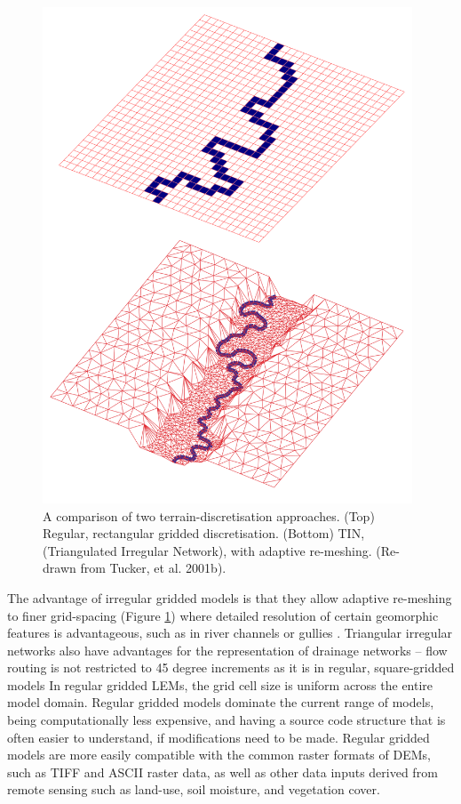 \begin{figure}[t]
\includegraphics[width=11cm]{LEMFinalRevisedmanuscriptDAVFinalrevisions-img/LEMFinalRevisedmanuscriptDAVFinalrevisions-img005.png} 
\caption{A comparison of two terrain-discretisation approaches. (Top) Regular, rectangular gridded discretisation. (Bottom) TIN, (Triangulated Irregular Network), with adaptive re-meshing. (Re-drawn from Tucker, et al. 2001b).}
\label{fig_LEM_discretisation}
\end{figure}

The advantage of irregular gridded models is that they allow adaptive re-meshing to finer grid-spacing (Figure \ref{fig_LEM_discretisation}) where detailed resolution of certain geomorphic features is advantageous, such as in river channels or gullies \citep{Braun1997,tucker2001child}. Triangular irregular networks also have advantages for the representation of drainage networks – flow routing is not restricted to 45 degree increments as it is in regular, square-gridded models \citep[Figure \ref{fig_LEM_flow_routing}][]{tucker2001child}
In regular gridded LEMs, the grid cell size is uniform across the entire model domain. Regular gridded models dominate the current range of models, being computationally less expensive, and having a source code structure that is often easier to understand, if modifications need to be made. Regular gridded models are more easily compatible with the common raster formats of DEMs, such as TIFF and ASCII raster data, as well as other data inputs derived from remote sensing such as land-use, soil moisture, and vegetation cover.

